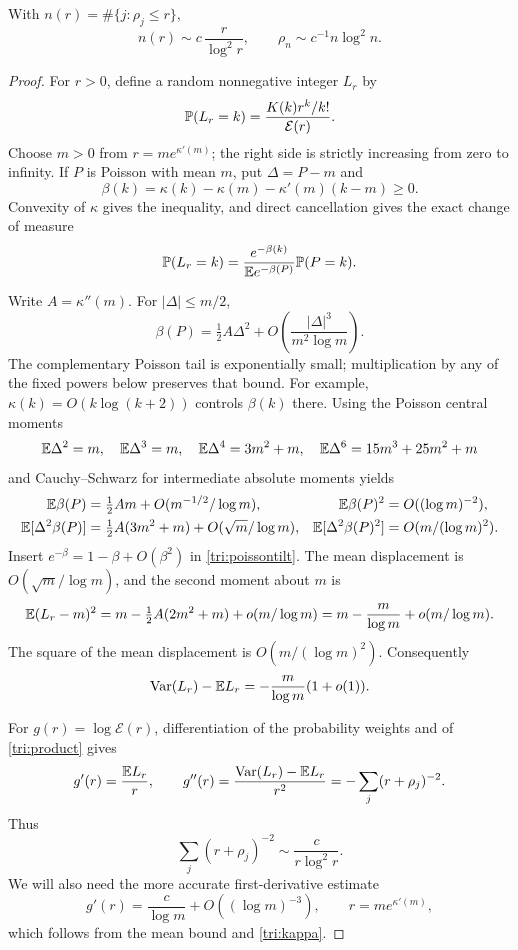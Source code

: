 \begin{lemma}\label{tri:zeros}
With $n(r)=\#\{j:\rho_j\le r\}$,
\[
 n(r)\sim c\,\frac r{\log^2r},\qquad
 \rho_n\sim c^{-1}n\log^2n.
\]
\end{lemma}
\begin{proof}
For $r>0$, define a random nonnegative integer $L_r$ by
\[
 \mathbb P(L_r=k)=\frac{K(k)r^k/k!}{\mathcal E(r)}.
\]
Choose $m>0$ from $r=me^{\kappa'(m)}$; the right side is strictly
increasing from zero to infinity.  If $P$ is Poisson with mean $m$,
put $\Delta=P-m$ and
\[
 \beta(k)=\kappa(k)-\kappa(m)-\kappa'(m)(k-m)\ge0.
\]
Convexity of $\kappa$ gives the inequality, and direct cancellation
gives the exact change of measure
\begin{equation}\label{tri:poissontilt}
 \mathbb P(L_r=k)=
 \frac{e^{-\beta(k)}}{\mathbb E e^{-\beta(P)}}\mathbb P(P=k).
\end{equation}

Write $A=\kappa''(m)$.  For $|\Delta|\le m/2$,
\[
 \beta(P)=\tfrac12A\Delta^2+
 O\left(\frac{|\Delta|^3}{m^2\log m}\right).
\]
The complementary Poisson tail is exponentially small; multiplication
by any of the fixed powers below preserves that bound.
For example, $\kappa(k)=O(k\log(k+2))$ controls $\beta(k)$ there.
Using the Poisson central moments
\[
 \mathbb E\Delta^2=m,\quad \mathbb E\Delta^3=m,\quad
 \mathbb E\Delta^4=3m^2+m,\quad
 \mathbb E\Delta^6=15m^3+25m^2+m
\]
and Cauchy--Schwarz for intermediate absolute moments yields
\[
 \begin{aligned}
 \mathbb E\beta(P)&=\tfrac12Am+O(m^{-1/2}/\log m),&
 \mathbb E\beta(P)^2&=O((\log m)^{-2}),\\
 \mathbb E[\Delta^2\beta(P)]
   &=\tfrac12A(3m^2+m)+O(\sqrt m/\log m),&
 \mathbb E[\Delta^2\beta(P)^2]&=O(m/(\log m)^2).
 \end{aligned}
\]
Insert $e^{-\beta}=1-\beta+O(\beta^2)$ in
\eqref{tri:poissontilt}.  The mean displacement is
$O(\sqrt m/\log m)$, and the second moment about $m$ is
\[
 \mathbb E(L_r-m)^2
 =m-\tfrac12A(2m^2+m)+o(m/\log m)
 =m-\frac m{\log m}+o(m/\log m).
\]
The square of the mean displacement is $O(m/(\log m)^2)$.
Consequently
\begin{equation}\label{tri:vardeficit}
 \operatorname{Var}(L_r)-\mathbb E L_r=-\frac m{\log m}(1+o(1)).
\end{equation}

For $g(r)=\log\mathcal E(r)$, differentiation of the probability
weights and of \eqref{tri:product} gives
\[
 g'(r)=\frac{\mathbb E L_r}{r},\qquad
 g''(r)=\frac{\operatorname{Var}(L_r)-\mathbb E L_r}{r^2}
      =-\sum_j(r+\rho_j)^{-2}.
\]
Thus
\begin{equation}\label{tri:stieltjes}
 \sum_j(r+\rho_j)^{-2}\sim\frac c{r\log^2r}.
\end{equation}
We will also need the more accurate first-derivative estimate
\begin{equation}\label{tri:firstderivative}
 g'(r)=\frac c{\log m}+O((\log m)^{-3}),
 \qquad r=me^{\kappa'(m)},
\end{equation}
which follows from the mean bound and \eqref{tri:kappa}.


\end{proof}

